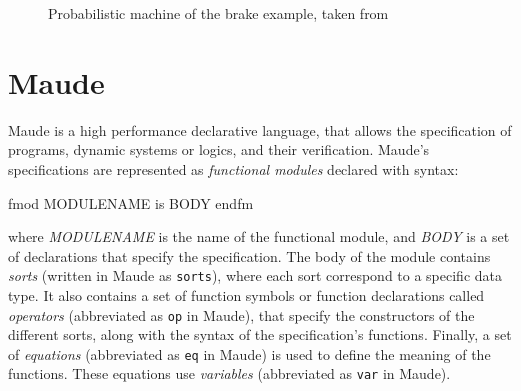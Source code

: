 \begin{example}
\begin{figure}[h]
    \quad
    \caption{Probabilistic machine of the brake example, taken from \cite{Aouadhi2017}}
    \label{fig:brake3}
\end{figure}


\end{example}


\section{Maude}

Maude \cite{MaudeManual, PeterMaude, Lecture1} is a high performance declarative language, that allows the specification of programs, dynamic systems or logics, and their verification.
Maude's specifications are represented as \textit{functional modules} declared with syntax: \\
\begin{maude}
fmod MODULENAME is
    BODY
endfm
\end{maude}
where \textit{MODULENAME} is the name of the functional module, and \textit{BODY} is a set of declarations that specify the specification. The body of the module contains \textit{sorts} (written in Maude as \texttt{sorts}), where each sort correspond to a specific data type. It also contains a set of function symbols or function declarations called \textit{operators} (abbreviated as \texttt{op} in Maude), that specify the constructors of the different sorts, along with the syntax of the specification's functions. Finally, a set of \textit{equations} (abbreviated as \texttt{eq} in Maude) is used to define the meaning of the functions. These equations use \textit{variables} (abbreviated as \texttt{var} in Maude). 

